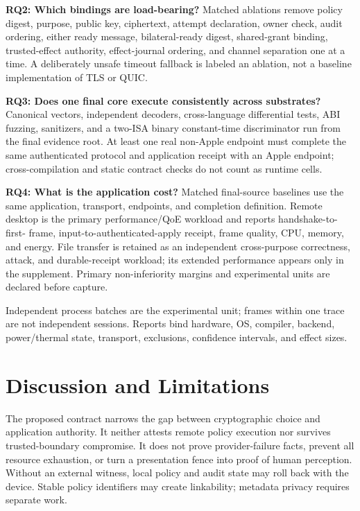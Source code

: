 \documentclass[journal]{IEEEtran}
\begin{document}
\textbf{RQ2: Which bindings are load-bearing?} Matched ablations remove policy
digest, purpose, public key, ciphertext, attempt declaration, owner check, audit
ordering, either ready message, bilateral-ready digest, shared-grant binding,
trusted-effect authority, effect-journal ordering, and channel separation one at a time. A deliberately unsafe timeout
fallback is labeled an ablation, not a baseline implementation of TLS or QUIC.

\textbf{RQ3: Does one final core execute consistently across substrates?}
Canonical vectors, independent decoders, cross-language differential tests, ABI
fuzzing, sanitizers, and a two-ISA binary constant-time discriminator run from
the final evidence root. At least one real non-Apple endpoint must complete the
same authenticated protocol and application receipt with an Apple endpoint;
cross-compilation and static contract checks do not count as runtime cells.

\textbf{RQ4: What is the application cost?} Matched final-source baselines use
the same application, transport, endpoints, and completion definition. Remote
desktop is the primary performance/QoE workload and reports handshake-to-first-
frame, input-to-authenticated-apply receipt, frame quality, CPU, memory, and
energy. File transfer is retained as an independent cross-purpose correctness,
attack, and durable-receipt workload; its extended performance appears only in
the supplement. Primary non-inferiority margins and experimental units are
declared before capture.

Independent process batches are the experimental unit; frames within one trace
are not independent sessions. Reports bind hardware, OS, compiler, backend,
power/thermal state, transport, exclusions, confidence intervals, and effect
sizes.

\section{Discussion and Limitations}

The proposed contract narrows the gap between cryptographic choice and
application authority. It neither attests remote policy execution nor survives
trusted-boundary compromise. It does not prove provider-failure facts, prevent
all resource exhaustion, or turn a presentation fence into proof of human
perception. Without an external witness, local policy and audit state may roll
back with the device. Stable policy identifiers may create linkability; metadata
privacy requires separate work.
\end{document}
